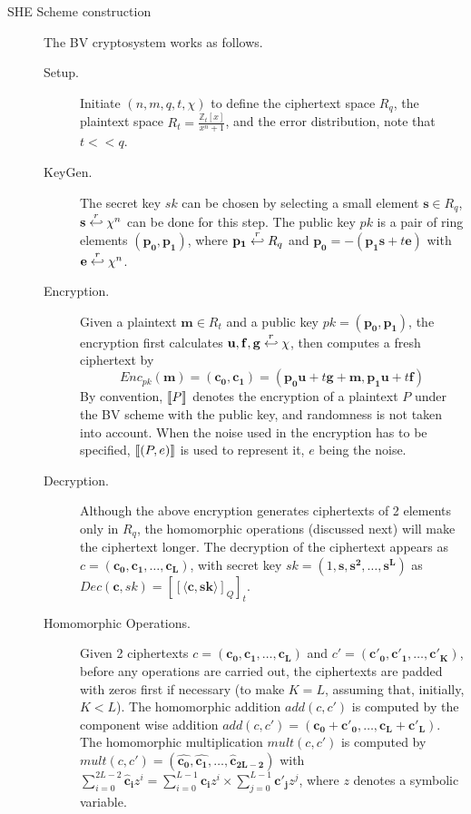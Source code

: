 \begin{description}
\item [SHE Scheme construction]
  \label{sec:BVScheme}
  The BV cryptosystem works as follows.
  \begin{description}
  \item[Setup.] Initiate $(n,m,q,t, \chi)$ to define the ciphertext space $R_q$,
    the plaintext space $R_t = \frac{\mathbb{Z}_{t}[x]}{x^{n} + 1}$, and the
    error distribution, note that \(t << q\).
  \item[KeyGen.] The secret key $sk$ can be chosen by selecting a small element
    $\mathbf{s} \in R_{q}$, $\mathbf{s} \stackrel{r}{\hookleftarrow} \chi^{n}$ can be done for this step. The
    public key $pk$ is a pair of ring elements $(\mathbf{p_0},\mathbf{p_1})$,
    where $\mathbf{p_1} \stackrel{r}{\hookleftarrow} R_q$ and
    $\mathbf{p_0} = -(\mathbf{p_1}\mathbf{s} + t\mathbf{e})$ with
    $\mathbf{e} \stackrel{r}{\hookleftarrow} \chi^{n}$.
  \item[Encryption.] Given a plaintext $\mathbf{m} \in R_t$ and a public key
    $pk=(\mathbf{p_0},\mathbf{p_1})$, the encryption first calculates
    $\mathbf{u},\mathbf{f},\mathbf{g} \stackrel{r}{\hookleftarrow} \chi$, then computes a fresh
    ciphertext by
    \[
      Enc_{pk}(\mathbf{m}) = (\mathbf{c_0},\mathbf{c_1}) =
      (\mathbf{p_0}\mathbf{u} + t\mathbf{g} + \mathbf{m},
      \mathbf{p_1}\mathbf{u} + t\mathbf{f})
    \]
    By convention, $\left\llbracket P\right\rrbracket$ denotes the encryption of a plaintext $P$
    under the BV scheme with the public key, and randomness is not taken into account. When the noise used in the encryption has to be specified,
    $\left\llbracket(P,e)\right\rrbracket$ is used to represent it, $e$ being the noise.
  \item[Decryption.] Although the above encryption generates ciphertexts of 2
    elements only in $R_q$, the homomorphic operations (discussed next) will
    make the ciphertext longer. The decryption of the ciphertext appears as
    $c=(\mathbf{c_0},\mathbf{c_1},\dots,\mathbf{c_L})$, with secret key
    $sk = (1, \mathbf{s}, \mathbf{s^2},\dots, \mathbf{s^L})$ as
    $ Dec(\mathbf{c},sk) = \left[\left[ \langle \mathbf{c}, \mathbf{sk} \rangle
      \right]_Q \right]_t $.
  \item[Homomorphic Operations.] Given 2 ciphertexts
    $c = (\mathbf{c_0},\mathbf{c_1},\dots,\mathbf{c_L})$ and
    $c' = (\mathbf{c'_0},\mathbf{c'_1},\dots,\mathbf{c'_{K}})$, before any
    operations are carried out, the ciphertexts are padded with zeros first if necessary (to
    make $K = L$, assuming that, initially, $K < L$).  The homomorphic addition
    $add(c,c')$ is computed by the component wise addition
    $add(c,c') = (\mathbf{c_0} +\mathbf{c'_0}, \dots,
    \mathbf{c_L}+\mathbf{c'_L})$. The homomorphic multiplication $mult(c,c')$ is
    computed by
    $mult(c,c') = (\mathbf{\hat{c_0}}, \mathbf{\hat{c_1}}, \dots,
    \mathbf{\hat{c}_{2L-2}})$ with
    $ \sum_{i=0}^{2L-2}\mathbf{\hat{c}_i}z^i = \sum_{i=0}^{L-1}\mathbf{c_i}z^i
    \times \sum_{j=0}^{L-1}\mathbf{c'_j}z^j $, where $z$ denotes a symbolic
    variable.

  \end{description}

\end{description}
